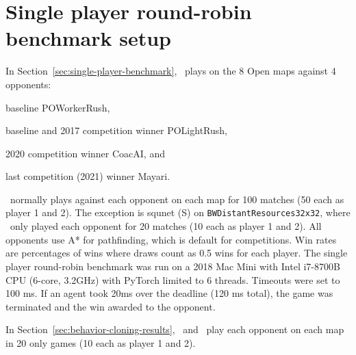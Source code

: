 \documentclass{article}
\begin{document}
\section{Single player round-robin benchmark setup}
In Section~\ref{sec:single-player-benchmark}, \agentName\ plays on the 8 Open maps
against 4 opponents:
\begin{inparaenum}[(1)]
    \item baseline POWorkerRush,
    \item baseline and 2017 competition winner POLightRush,
    \item 2020 competition winner CoacAI, and
    \item last competition (2021) winner Mayari.
\end{inparaenum}
\agentName\ normally plays against each opponent on each map for 100 matches (50
each as player 1 and 2). The exception is squnet (S) on \texttt{BWDistantResources32x32},
where \agentName\ only played each opponent for 20 matches (10 each as player 1 and 2).
All opponents use A* for pathfinding, which is default for competitions.  Win rates are 
percentages of wins where draws count as 0.5 wins for each player. The single player 
round-robin benchmark was run on a 2018 Mac Mini with Intel i7-8700B CPU (6-core, 
3.2GHz) with PyTorch limited to 6 threads. Timeouts were set to 100 ms. If
an agent took 20ms over the deadline (120 ms total), the game was terminated and the win
awarded to the opponent.

In Section~\ref{sec:behavior-cloning-results}, \bcAgent\ and \bcPPOAgent\ play each opponent on each map in 20 only games
(10 each as player 1 and 2).
\end{document}
